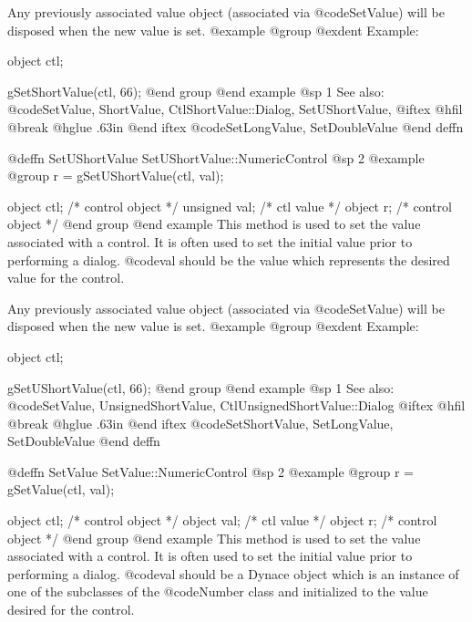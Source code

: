 {Any previously associated value object (associated via @code{SetValue})
will be disposed when the new value is set.
@example
@group
@exdent Example:

object  ctl;

gSetShortValue(ctl, 66);
@end group
@end example
@sp 1
See also:  @code{SetValue, ShortValue, CtlShortValue::Dialog, SetUShortValue,}
@iftex
@hfil @break @hglue .63in 
@end iftex
@code{SetLongValue, SetDoubleValue}
@end deffn











@deffn {SetUShortValue} SetUShortValue::NumericControl
@sp 2
@example
@group
r = gSetUShortValue(ctl, val);

object    ctl;  /*  control object  */
unsigned  val;  /*  ctl value       */
object    r;    /*  control object  */
@end group
@end example
This method is used to set the value associated with a control.  It is
often used to set the initial value prior to performing a dialog.
@code{val} should be the value which represents the desired value for
the control.

Any previously associated value object (associated via @code{SetValue})
will be disposed when the new value is set.
@example
@group
@exdent Example:

object  ctl;

gSetUShortValue(ctl, 66);
@end group
@end example
@sp 1
See also:  @code{SetValue, UnsignedShortValue, CtlUnsignedShortValue::Dialog}
@iftex
@hfil @break @hglue .63in 
@end iftex
@code{SetShortValue, SetLongValue, SetDoubleValue}
@end deffn
















@deffn {SetValue} SetValue::NumericControl
@sp 2
@example
@group
r = gSetValue(ctl, val);

object  ctl;    /*  control object  */
object  val;    /*  ctl value       */
object  r;      /*  control object  */
@end group
@end example
This method is used to set the value associated with a control.  It is
often used to set the initial value prior to performing a dialog.
@code{val} should be a Dynace object which is an instance of one of the
subclasses of the @code{Number} class and initialized to the value
desired for the control.

}
